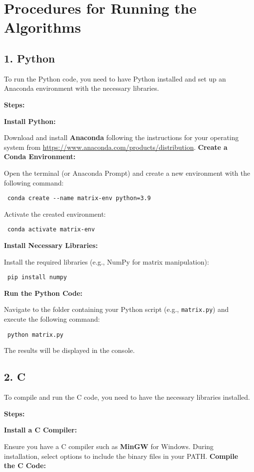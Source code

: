 \documentclass{article} \usepackage{hyperref}
\begin{document}
\section{Procedures for Running the Algorithms}

\subsection{1. Python} To run the Python code, you need to have Python installed and set up an Anaconda environment with the necessary libraries.

\textbf{Steps:}

\textbf{Install Python:}

Download and install \textbf{Anaconda} following the instructions for your operating system from \url{https://www.anaconda.com/products/distribution}.
\textbf{Create a Conda Environment:}

Open the terminal (or Anaconda Prompt) and create a new environment with the following command: \begin{verbatim} conda create --name matrix-env python=3.9 \end{verbatim}
Activate the created environment: \begin{verbatim} conda activate matrix-env \end{verbatim}
\textbf{Install Necessary Libraries:}

Install the required libraries (e.g., NumPy for matrix manipulation): \begin{verbatim} pip install numpy \end{verbatim}
\textbf{Run the Python Code:}

Navigate to the folder containing your Python script (e.g., \texttt{matrix.py}) and execute the following command: \begin{verbatim} python matrix.py \end{verbatim}
The results will be displayed in the console.
\subsection{2. C} To compile and run the C code, you need to have the necessary libraries installed.

\textbf{Steps:}

\textbf{Install a C Compiler:}

Ensure you have a C compiler such as \textbf{MinGW} for Windows. During installation, select options to include the binary files in your PATH.
\textbf{Compile the C Code:}
\end{document}
